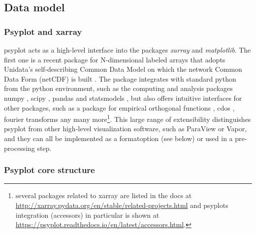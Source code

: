 \begin{refsection}
\subsection{Data model}  \label{sec:psyplot-model}

\subsubsection{Psyplot and xarray}  \label{sec:psyplot-dependencies}

psyplot acts as a high-level interface into the packages \textit{xarray} and \textit{matplotlib}. The first one is a recent package for N-dimensional labeled arrays that adopts Unidata’s self-describing Common Data Model on which the network Common Data Form (netCDF) is built \citep{RewDavis1990, BrownFolkGoucherEtAl1993, HoyerHamman2017}. The package integrates with standard python from the python environment, such as the computing and analysis packages numpy \citep{Oliphant2006}, scipy \citep{JonesOliphantPetersonEtAl2001, Oliphant2007}, pandas \citep{McKinney2010} and statsmodels \citep{SeaboldPerktold2010}, but also offers intuitive interfaces for other packages, such as a package for empirical orthogonal functions \citep[EOFs, ][]{Dawson2016}, \glspl{cdo} \citep{Mueller2019}, fourier transforms \citep{UchidaRokemNicholasEtAl2019} any many more\footnote{\label{foot:xraccessors} several packages related to xarray are listed in the docs at \url{http://xarray.pydata.org/en/stable/related-projects.html} and psyplots integration (accessors) in particular is shown at \url{https://psyplot.readthedocs.io/en/latest/accessors.html}.}. This large range of extensibility distinguishes psyplot from other high-level visualization software, such as ParaView or Vapor, and they can all be implemented as a formatoption (see below) or used in a pre-processing step.

\subsubsection{Psyplot core structure}  \label{sec:psyplot-core}  


\end{refsection}
